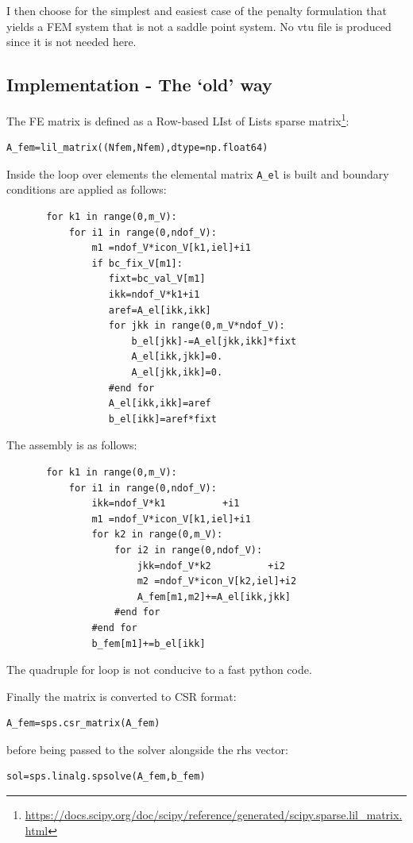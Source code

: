 I then choose for the simplest and easiest case of the penalty formulation that yields a FEM system that 
is not a saddle point system. No vtu file is produced since it is not needed here.

\subsection*{Implementation - The `old' way}

The FE matrix is defined as a Row-based LIst of Lists sparse 
matrix\footnote{\url{https://docs.scipy.org/doc/scipy/reference/generated/scipy.sparse.lil_matrix.html}}:
\begin{lstlisting}
A_fem=lil_matrix((Nfem,Nfem),dtype=np.float64)
\end{lstlisting}
Inside the loop over elements the elemental matrix \lstinline{A_el} is built
and boundary conditions are applied as follows:
\begin{lstlisting}
       for k1 in range(0,m_V):
           for i1 in range(0,ndof_V):
               m1 =ndof_V*icon_V[k1,iel]+i1
               if bc_fix_V[m1]: 
                  fixt=bc_val_V[m1]
                  ikk=ndof_V*k1+i1
                  aref=A_el[ikk,ikk]
                  for jkk in range(0,m_V*ndof_V):
                      b_el[jkk]-=A_el[jkk,ikk]*fixt
                      A_el[ikk,jkk]=0.
                      A_el[jkk,ikk]=0.
                  #end for
                  A_el[ikk,ikk]=aref
                  b_el[ikk]=aref*fixt
\end{lstlisting}

The assembly is as follows:

\begin{lstlisting}
       for k1 in range(0,m_V):
           for i1 in range(0,ndof_V):
               ikk=ndof_V*k1          +i1
               m1 =ndof_V*icon_V[k1,iel]+i1
               for k2 in range(0,m_V):
                   for i2 in range(0,ndof_V):
                       jkk=ndof_V*k2          +i2
                       m2 =ndof_V*icon_V[k2,iel]+i2
                       A_fem[m1,m2]+=A_el[ikk,jkk]
                   #end for
               #end for
               b_fem[m1]+=b_el[ikk]
\end{lstlisting}
The quadruple for loop is not conducive to a fast python code.

Finally the matrix is converted to CSR format:
\begin{lstlisting}
A_fem=sps.csr_matrix(A_fem)
\end{lstlisting}
before being passed to the solver alongside the rhs vector:
\begin{lstlisting}
sol=sps.linalg.spsolve(A_fem,b_fem)
\end{lstlisting}

